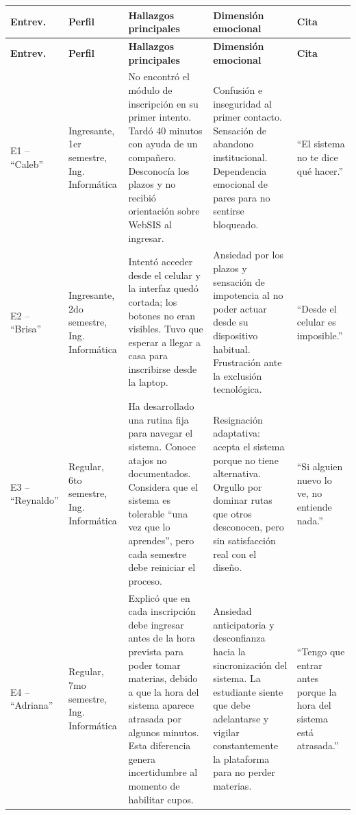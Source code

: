 \begingroup
\footnotesize
\setlength{\tabcolsep}{3pt}
\renewcommand{\arraystretch}{1.25}
\begin{longtable}{|p{1.8cm}|p{2.5cm}|p{3.2cm}|p{3.2cm}|p{2.4cm}|}
\hline
\textbf{Entrev.} & \textbf{Perfil} & \textbf{Hallazgos principales} & \textbf{Dimensión emocional} & \textbf{Cita} \\
\hline
\endfirsthead

\hline
\textbf{Entrev.} & \textbf{Perfil} & \textbf{Hallazgos principales} & \textbf{Dimensión emocional} & \textbf{Cita} \\
\hline
\endhead

E1 -- ``Caleb'' & Ingresante, 1er semestre, Ing. Informática & No encontró el módulo de inscripción en su primer intento. Tardó 40 minutos con ayuda de un compañero. Desconocía los plazos y no recibió orientación sobre WebSIS al ingresar. & Confusión e inseguridad al primer contacto. Sensación de abandono institucional. Dependencia emocional de pares para no sentirse bloqueado. & ``El sistema no te dice qué hacer.'' \\
\hline
E2 -- ``Brisa'' & Ingresante, 2do semestre, Ing. Informática & Intentó acceder desde el celular y la interfaz quedó cortada; los botones no eran visibles. Tuvo que esperar a llegar a casa para inscribirse desde la laptop. & Ansiedad por los plazos y sensación de impotencia al no poder actuar desde su dispositivo habitual. Frustración ante la exclusión tecnológica. & ``Desde el celular es imposible.'' \\
\hline
E3 -- ``Reynaldo'' & Regular, 6to semestre, Ing. Informática & Ha desarrollado una rutina fija para navegar el sistema. Conoce atajos no documentados. Considera que el sistema es tolerable ``una vez que lo aprendes'', pero cada semestre debe reiniciar el proceso. & Resignación adaptativa: acepta el sistema porque no tiene alternativa. Orgullo por dominar rutas que otros desconocen, pero sin satisfacción real con el diseño. & ``Si alguien nuevo lo ve, no entiende nada.'' \\
\hline
E4 -- ``Adriana'' & Regular, 7mo semestre, Ing. Informática & Explicó que en cada inscripción debe ingresar antes de la hora prevista para poder tomar materias, debido a que la hora del sistema aparece atrasada por algunos minutos. Esta diferencia genera incertidumbre al momento de habilitar cupos. & Ansiedad anticipatoria y desconfianza hacia la sincronización del sistema. La estudiante siente que debe adelantarse y vigilar constantemente la plataforma para no perder materias. & ``Tengo que entrar antes porque la hora del sistema está atrasada.'' \\

\end{longtable}
